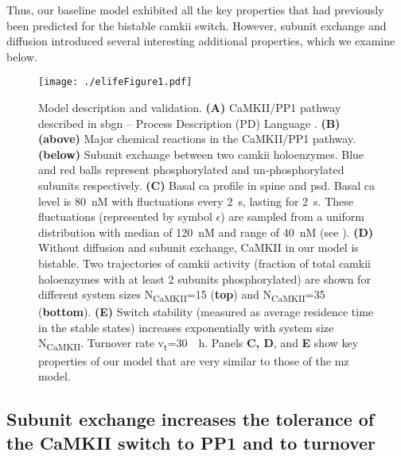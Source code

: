 \documentclass[9pt,lineno,doublespacing]{elife}
\newcommand\SUB[2]{#1\textsubscript{#2}}
\begin{document}
Thus, our baseline model exhibited all the key properties that had
previously been predicted for the bistable \gls{camkii} switch. However, 
subunit exchange and diffusion introduced several interesting additional
properties, which we examine below.

\begin{figure}[t]%
    \texttt{[image: ./elifeFigure1.pdf]}
    \caption{Model description and validation. \textbf{(A)} CaMKII/PP1 pathway
        described in \gls{sbgn} -- Process Description (PD) Language
        \citep{novere_systems_2009}. \textbf{(B)} \textbf{(above)} Major
        chemical reactions in the CaMKII/PP1 pathway. \textbf{(below)} Subunit
        exchange between two \gls{camkii} holoenzymes. Blue and red balls
        represent phosphorylated and un-phosphorylated subunits respectively.
        \textbf{(C)} Basal \gls{ca} profile in spine and \gls{psd}. Basal
        \gls{ca} level is \SI{80}{\nano M} with fluctuations every
        \SI{2}{\second}, lasting for \SI{2}{\second}. These fluctuations
        (represented by symbol $\epsilon$) are sampled from a uniform distribution with median of
        \SI{120}{\nano M} and range of \SI{40}{\nano M} (see
        ). \textbf{(D)} Without diffusion and subunit exchange,
        CaMKII in our model is bistable. Two trajectories of \gls{camkii}
        activity (fraction of total \gls{camkii} holoenzymes with at least 2
        subunits phosphorylated) are shown for different system sizes
        \SUB{N}{CaMKII}=15 (\textbf{top}) and \SUB{N}{CaMKII}=35
	(\textbf{bottom}). \textbf{(E)} Switch stability (measured as average
	residence time in the stable states) increases exponentially with system
        size \SUB{N}{CaMKII}. Turnover rate \SUB{v}{t}=\SI{30}{\per \hour}.
        Panels \textbf{C, D}, and \textbf{E} show key properties of our model
        that are very similar to those of the \gls{mz} model.
    }\label{fig:validation} 
\end{figure}


\subsection{Subunit exchange increases the tolerance of the CaMKII switch to PP1
and to turnover}\label{subsec:result_tolerance}
\end{document}
